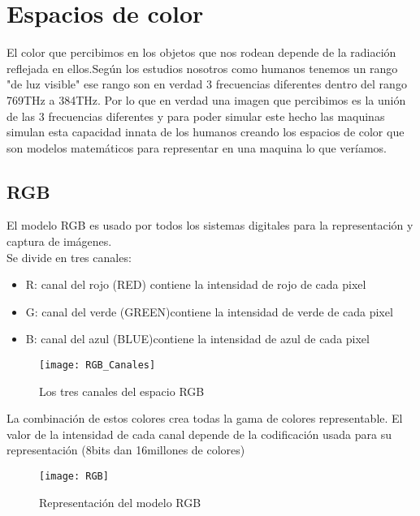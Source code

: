 
\section{Espacios de color }
El color que percibimos en los objetos que nos rodean depende de la radiación reflejada en ellos.Según los estudios nosotros como humanos tenemos un rango "de luz visible" ese rango son en verdad 3 frecuencias diferentes dentro del rango 769THz a 384THz.
Por lo que en verdad una imagen que percibimos es la unión de las 3 frecuencias diferentes y para poder simular este hecho las maquinas simulan esta capacidad innata de los humanos creando los espacios de color que son modelos matemáticos para representar en una maquina lo que veríamos.


\subsection{RGB}
El modelo RGB es usado por todos los sistemas digitales para la representación y captura de imágenes.\\
Se divide en tres canales:\\
\begin{itemize}
	\item R: canal del rojo (RED) contiene la intensidad de rojo de cada pixel\\
	\item G: canal del verde (GREEN)contiene la intensidad de verde de cada pixel\\
	\item B: canal del azul (BLUE)contiene la intensidad de azul de cada pixel\\
\end{itemize}

\begin{figure}[h]
\centering
\texttt{[image: RGB\_Canales]}
\caption{Los tres canales del espacio RGB}
\end{figure}

La combinación de estos colores crea todas la gama de colores representable.
El valor de la intensidad de cada canal depende de la codificación usada para su representación (8bits dan 16millones de colores)

\begin{figure}[h]
\centering
\texttt{[image: RGB]}
\caption{Representación del modelo RGB}
\end{figure}

